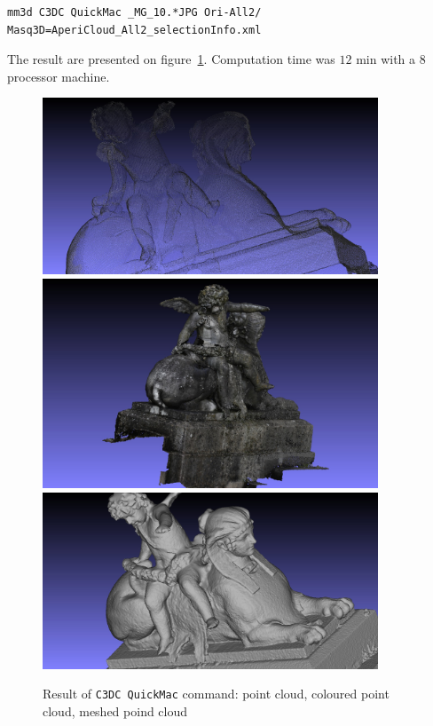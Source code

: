 \begin{verbatim}
mm3d C3DC QuickMac _MG_10.*JPG Ori-All2/ Masq3D=AperiCloud_All2_selectionInfo.xml
\end{verbatim}


The result are presented on figure~\ref{FIG:Angel:Result}. Computation time was $12$ min with a $8$ processor machine.




\begin{figure}[H]
\begin{center}
\includegraphics[width=100mm]{FIGS/Ange/snapshot00.jpg}
\includegraphics[width=100mm]{FIGS/Ange/snapshot01.jpg}
\includegraphics[width=100mm]{FIGS/Ange/snapshot201.jpg}
\end{center}
\caption{Result of {\tt C3DC QuickMac} command: point cloud, coloured point cloud, meshed poind cloud}
\label{FIG:Angel:Result}
\end{figure}

